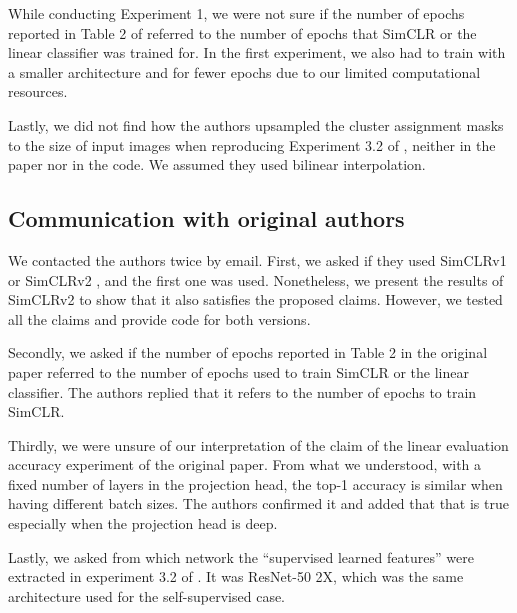     While conducting Experiment 1, we were not sure if the number of epochs reported in Table 2 of \cite{chen2021intriguing} referred to the number of epochs that SimCLR or the linear classifier was trained for. In the first experiment, we also had to train with a smaller architecture and for fewer epochs due to  our limited computational resources.
    
    Lastly, we did not find how the authors upsampled the cluster assignment masks to the size of input images when reproducing Experiment 3.2 of \cite{chen2021intriguing}, neither in the paper nor in the code. We assumed they used bilinear interpolation. 
    
    
    
\subsection{Communication with original authors}
We contacted the authors twice by email. 
First, we asked if they used SimCLRv1 \cite{simclr} or SimCLRv2 \cite{chen2020big}, and the first one was used.
Nonetheless, we present the results of SimCLRv2 to show that it also satisfies the proposed claims. However, we tested all the claims and provide code for both versions.

Secondly, we asked if the number of epochs reported in Table 2 in the original paper referred to the number of epochs used to train SimCLR or the linear classifier. The authors replied that it refers to the number of epochs to train SimCLR.

Thirdly, we were unsure of our interpretation of the claim of the linear evaluation accuracy experiment of the original paper. 
From what we understood, with a fixed number of layers in the projection head, the top-1 accuracy is similar when having different batch sizes.
The authors confirmed it and added that that is true especially when the projection head is deep.

Lastly, we asked from which network the “supervised learned features” were extracted in experiment 3.2 of \cite{chen2021intriguing}. It was ResNet-50 2X, which was the same architecture used for the self-supervised case.






